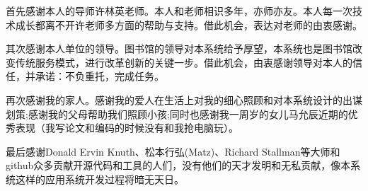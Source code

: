 
\begin{ack}
  首先感谢本人的导师许林英老师。本人和老师相识多年，亦师亦友。本人每一次技术成长都离不开许老师多方面的帮助与支持。借此机会，表达对老师的由衷感谢。

  其次感谢本人单位的领导。图书馆的领导对本系统给予厚望，本系统也是图书馆改变传统服务模式，进行改革创新的关键一步。借此机会，由衷感谢领导对本人的信任，并承诺：不负重托，完成任务。

  再次感谢我的家人。感谢我的爱人在生活上对我的细心照顾和对本系统设计的出谋划策;感谢我的父母帮助我们照顾小孩;同时也感谢我一周岁的女儿马允辰近期的优秀表现（我写论文和编码的时候没有和我抢电脑玩）。

  最后感谢Donald Ervin Knuth、松本行弘(Matz)、Richard Stallman等大师和github众多贡献开源代码和工具的人们，没有他们的天才发明和无私贡献，像本系统这样的应用系统开发过程将暗无天日。
\end{ack}
